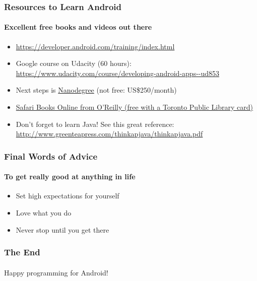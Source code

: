\documentclass{beamer}
\begin{document}
	\begin{frame}
	\frametitle{Resources to Learn Android}
	\framesubtitle{Excellent free books and videos out there}
	\begin{itemize}
		\item \url{https://developer.android.com/training/index.html}
		\item Google course on Udacity (60 hours): \url{https://www.udacity.com/course/developing-android-apps--ud853}
		\item Next steps is \href{https://www.udacity.com/course/android-developer-nanodegree-by-google--nd801?v=ad1}{Nanodegree} (not free: US\$250/month)
		\item \href{https://www.safaribooksonline.com}{Safari Books Online from O'Reilly (free with a Toronto Public Library card)}
		\item Don't forget to learn Java! See this great reference: \url{http://www.greenteapress.com/thinkapjava/thinkapjava.pdf}
	\end{itemize}
	\end{frame}


	\begin{frame}
	\frametitle{Final Words of Advice}
	\framesubtitle{To get really good at anything in life}
	\begin{itemize}
		\item Set high expectations for yourself
		\item Love what you do
		\item Never stop until you get there
	\end{itemize}
	\end{frame}

	\begin{frame}
	\frametitle{The End}
	\framesubtitle{}
	\centering
	Happy programming for Android!
	\end{frame}
\end{document}
